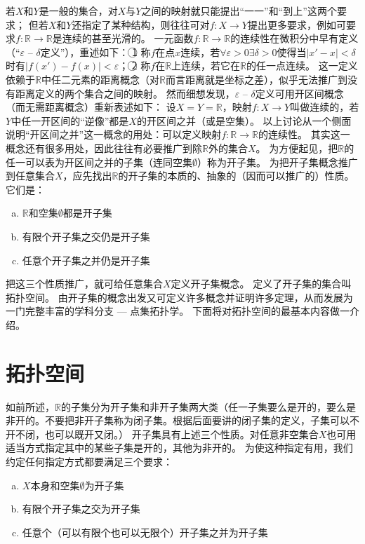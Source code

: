 若$X$和$Y$是一般的集合，对$X$与$Y$之间的映射就只能提出``一一''和``到上''这两个要求；
但若$X$和$Y$还指定了某种结构，则往往可对$f \colon X \to Y$提出更多要求，例如可要求$f \colon \mathbb{R} \to \mathbb{R}$是连续的甚至光滑的。
一元函数$f \colon \mathbb{R} \to \mathbb{R}$的连续性在微积分中早有定义（``$\varepsilon$ -- $\delta$定义''），重述如下：
\textcircled{1} 称$f$在点$x$连续，若$\forall \varepsilon > 0 \exists \delta > 0$使得当$|x' - x| < \delta$时有$|f(x') - f(x)| < \varepsilon$；
\textcircled{2} 称$f$在$\mathbb{R}$上连续，若它在$\mathbb{R}$的任一点连续。
这一定义依赖于$\mathbb{R}$中任二元素的距离概念（对$\mathbb{R}$而言距离就是坐标之差），似乎无法推广到没有距离定义的两个集合之间的映射。
然而细想发现，$\varepsilon$ -- $\delta$定义可用开区间概念（而无需距离概念）重新表述如下：
设$X = Y = \mathbb{R}$，映射$f \colon X \to Y$叫做连续的，若$Y$中任一开区间的``逆像''都是$X$的开区间之并（或是空集）。
以上讨论从一个侧面说明``开区间之并''这一概念的用处：可以定义映射$f \colon \mathbb{R} \to \mathbb{R}$的连续性。
其实这一概念还有很多用处，因此往往有必要推广到除$\mathbb{R}$外的集合$X$。
为方便起见，把$\mathbb{R}$的任一可以表为开区间之并的子集（连同空集$\emptyset$）称为开子集。
为把开子集概念推广到任意集合$X$，应先找出$\mathbb{R}$的开子集的本质的、抽象的（因而可以推广的）性质。
它们是：
\begin{enumerate}[(a)]
	\item $\mathbb{R}$和空集$\emptyset$都是开子集
	\item 有限个开子集之交仍是开子集
	\item 任意个开子集之并仍是开子集
\end{enumerate}

把这三个性质推广，就可给任意集合$X$定义开子集概念。
定义了开子集的集合叫拓扑空间。
由开子集的概念出发又可定义许多概念并证明许多定理，从而发展为一门完整丰富的学科分支 --- 点集拓扑学。
下面将对拓扑空间的最基本内容做一介绍。

\section{拓扑空间}

如前所述，$\mathbb{R}$的子集分为开子集和非开子集两大类（任一子集要么是开的，要么是非开的。不要把非开子集称为闭子集。根据后面要讲的闭子集的定义，子集可以不开不闭，也可以既开又闭。）
开子集具有上述三个性质。对任意非空集合$X$也可用适当方式指定其中的某些子集是开的，其他为非开的。
为使这种指定有用，我们约定任何指定方式都要满足三个要求：
\begin{enumerate}[(a)]
	\item $X$本身和空集$\emptyset$为开子集
	\item 有限个开子集之交为开子集
	\item 任意个（可以有限个也可以无限个）开子集之并为开子集
\end{enumerate}

